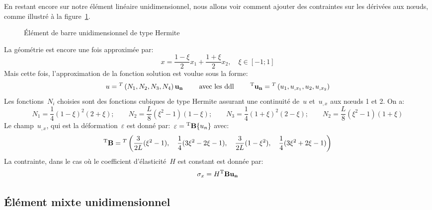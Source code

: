 En restant encore sur notre élément linéaire unidimensionnel, nous allons voir comment ajouter des contraintes sur les dérivées aux nœuds, comme illustré à la figure~\ref{fig-ex2Her}.
\begin{figure}[h!]\centering
{} \hspace{5em}
\caption{Élément de barre unidimensionnel de type Hermite}\label{fig-ex2Her}
\end{figure}
\medskipvm
La géométrie est encore une fois approximée par:
\begin{equation} x=\frac{1-\xi}2 x_1 + \frac{1+\xi}2 x_2, \quad \xi\in[-1;1] \end{equation}
\medskipvm
Mais cette fois, l'approximation de la fonction solution est voulue sous la forme:
\begin{equation}
u = \LLL{N_1, N_2, N_3, N_4}\VV{u_n} \qquad \text{ avec les ddl } \qquad
\LL{u_n}=\LLL{u_1, u_{,x_1}, u_2, u_{,x_2}} 
\end{equation}
\medskipvm
Les fonctions~$N_i$ choisies sont des fonctions cubiques de type Hermite assurant une continuité de~$u$ et~$u_{,x}$ aux nœuds 1 et 2. On a:
\begin{equation}
N_1=\frac14(1-\xi)^2(2+\xi); \qquad
N_2=\frac{L}8(\xi^2-1)(1-\xi); \qquad
N_3=\frac14(1+\xi)^2(2-\xi); \qquad
N_2=\frac{L}8(\xi^2-1)(1+\xi)
\end{equation}
\medskipvm
Le champ~$u_{,x}$, qui est la déformation~$\varepsilon$ est donné par:~$\varepsilon={}^\mathrm{T}\mathbf{B}\{u_n\}$ avec:
\begin{equation} {}^\mathrm{T}\mathbf{B}={}^T\left( \frac3{2L}(\xi^2-1), \quad \frac14(3\xi^2-2\xi-1), \quad \frac3{2L}(1-\xi^2), \quad
\frac14(3\xi^2+2\xi-1)\right)\end{equation}
\medskipvm
La contrainte, dans le cas où le coefficient d'élasticité~$H$ est constant est donnée par:
\begin{equation}\sigma_x=H \LL{B}\VV{u_n}\end{equation}

\medskip
\subsection{Élément mixte unidimensionnel}

